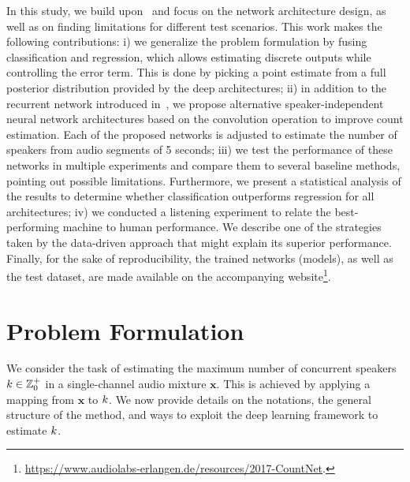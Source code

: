 In this study, we build upon~\cite{stoeter17} and focus on the network architecture design, as well as on finding limitations for different test scenarios.
This work makes the following contributions:
i) we generalize the problem formulation by fusing classification and regression, which allows estimating discrete outputs while controlling the error term. This is done by picking a point estimate from a full posterior distribution provided by the deep architectures;
ii) in addition to the recurrent network introduced in~\cite{stoeter17}, we propose alternative speaker-independent neural network architectures based on the convolution operation to improve count estimation.
Each of the proposed networks is adjusted to estimate the number of speakers from audio segments of 5 seconds;
iii) we test the performance of these networks in multiple experiments and compare them to several baseline methods, pointing out possible limitations.
Furthermore, we present a statistical analysis of the results to determine whether classification outperforms regression for all architectures;
iv) we conducted a listening experiment to relate the best-performing machine to human performance.
We describe one of the strategies taken by the data-driven approach that might explain its superior performance.
Finally, for the sake of reproducibility, the trained networks (models), as well as the test dataset, are made available on the accompanying website\footnote{\url{https://www.audiolabs-erlangen.de/resources/2017-CountNet}.}.


\section{Problem Formulation}%
\label{sec:problem_formulation}
We consider the task of estimating the maximum number of concurrent speakers \( k \in \mathbb{Z}^{+}_{0} \) in a single-channel audio mixture \(\mathbf{x}\).
This is achieved by applying a mapping from \(\mathbf{x}\) to \(k \).
We now provide details on the notations, the general structure of the method, and ways to exploit the deep learning framework to estimate \(k \).

